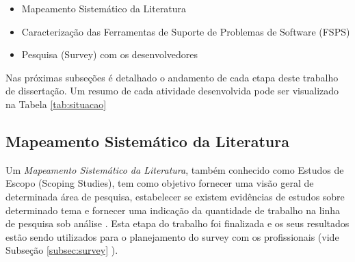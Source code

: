 \documentclass[10pt,a4paper]{report}
\begin{document}
\begin{itemize}
	\item Mapeamento Sistemático da Literatura \cite{keele2007guidelines}
	\item Caracterização das Ferramentas de Suporte de Problemas de Software
		(FSPS)
	\item Pesquisa (Survey) com os desenvolvedores
		\cite{wohlin2012experimentation}
\end{itemize}


Nas próximas subseções é detalhado o andamento de cada etapa deste trabalho de
dissertação. Um resumo de cada atividade desenvolvida pode ser visualizado na
Tabela \ref{tab:situacao}

\begin{table}[ht]
	\centering
	\caption{Situação das Atividades da Dissertação}
	\label{tab:situacao}
\end{table}


\subsection{Mapeamento Sistemático da Literatura}
\label{subsec:revisao_sistematica}

Um \textit{Mapeamento Sistemático da Literatura}, também conhecido como Estudos
de Escopo (Scoping Studies), tem como objetivo fornecer uma visão geral de
determinada área de pesquisa, estabelecer se existem evidências de estudos sobre
determinado tema e fornecer uma indicação da quantidade de trabalho na linha de
pesquisa sob análise \cite{keele2007guidelines,wohlin2012experimentation}. Esta
etapa do trabalho foi finalizada e os seus resultados estão sendo utilizados
para o planejamento do survey com os profissionais (vide Subseção
\ref{subsec:survey} ).
\end{document}
